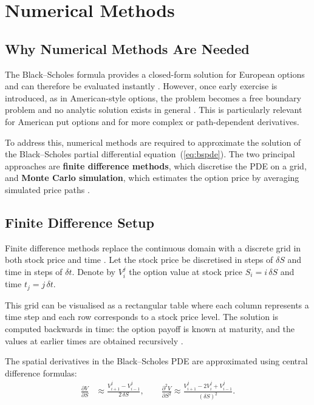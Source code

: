 \documentclass[12pt]{article}
\begin{document}
\section{Numerical Methods}
\label{sec:numerical}

\subsection{Why Numerical Methods Are Needed}

The Black--Scholes formula provides a closed-form solution for European options and
can therefore be evaluated instantly \cite{hull2018}. However, once early exercise
is introduced, as in American-style options, the problem becomes a free boundary
problem and no analytic solution exists in general \cite{wilmott2006}. This is
particularly relevant for American put options and for more complex or
path-dependent derivatives.

To address this, numerical methods are required to approximate the solution of the
Black--Scholes partial differential equation~(\ref{eq:bspde}). The two principal
approaches are \textbf{finite difference methods}, which discretise the PDE on a
grid, and \textbf{Monte Carlo simulation}, which estimates the option price by
averaging simulated price paths \cite{glasserman2004,seydel2012}.

\subsection{Finite Difference Setup}

Finite difference methods replace the continuous domain with a discrete grid in both
stock price and time \cite{seydel2012}. Let the stock price be discretised in steps
of $\delta S$ and time in steps of $\delta t$. Denote by $V_i^j$ the option value
at stock price $S_i = i\,\delta S$ and time $t_j = j\,\delta t$.

This grid can be visualised as a rectangular table where each column represents a
time step and each row corresponds to a stock price level. The solution is computed
backwards in time: the option payoff is known at maturity, and the values at earlier
times are obtained recursively \cite{wilmott2006}.

The spatial derivatives in the Black--Scholes PDE are approximated using central
difference formulas:
\begin{align}
  \frac{\partial V}{\partial S} &\approx \frac{V_{i+1}^j - V_{i-1}^j}{2\,\delta S}, \qquad
  \frac{\partial^2 V}{\partial S^2} \approx \frac{V_{i+1}^j - 2V_i^j + V_{i-1}^j}{(\delta S)^2}.
\end{align}
\end{document}
